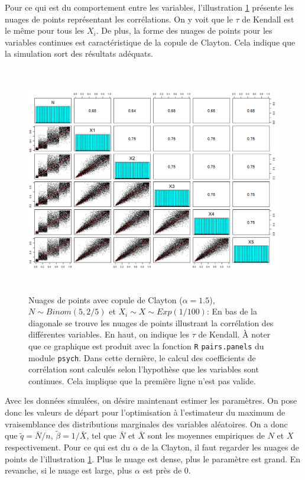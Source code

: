 \documentclass{article}
\begin{document}
		Pour ce qui est du comportement entre les variables, l'illustration \ref{graph_scatterplot_Binom} présente les nuages de points représentant les corrélations. On y voit que le $\tau$ de Kendall est le même pour tous les $X_i$. De plus, la forme des nuages de points pour les variables continues est caractéristique de la copule de Clayton. Cela indique que la simulation sort des résultats adéquats.\\
		
		\begin{figure}[H]
			\centering
			\includegraphics[height=10cm]{Graph/scatterplot_Binom.png}
			\caption[Nuages de points du scénario \ref{scenario_Clayton_Binom}]
			{Nuages de points avec copule de Clayton ($\alpha = 1.5$), $N\sim Binom(5,2/5)$ et $X_i \sim X\sim Exp(1/100)$:
				En bas de la diagonale se trouve les nuages de points illustrant la corrélation des différentes variables. En haut, on indique les $\tau$ de Kendall. À noter que ce graphique est produit avec la fonction \texttt{R} \texttt{pairs.panels} du module \texttt{psych}. Dans cette dernière, le calcul des coefficients de corrélation sont calculés selon l'hypothèse que les variables sont continues. Cela implique que la première ligne n'est pas valide.}
			\label{graph_scatterplot_Binom}
		\end{figure}
		
		Avec les données simulées, on désire maintenant estimer les paramètres. On pose donc les valeurs de départ pour l'optimisation à l'estimateur du maximum de vraisemblance des distributions marginales des variables aléatoires. On a donc que $\tilde{q} = \bar{N}/n$, $\tilde{\beta} = 1/\bar{X}$, tel que $\bar{N}$ et $\bar{X}$ sont les moyennes empiriques de $N$ et $X$ respectivement. Pour ce qui est du $\alpha$ de la Clayton, il faut regarder les nuages de points de  l'illustration \ref{graph_scatterplot_Binom}. Plus le nuage est dense, plus le paramètre est grand. En revanche, si le nuage est large, plus $\alpha$ est près de 0.\\
		
\end{document}
